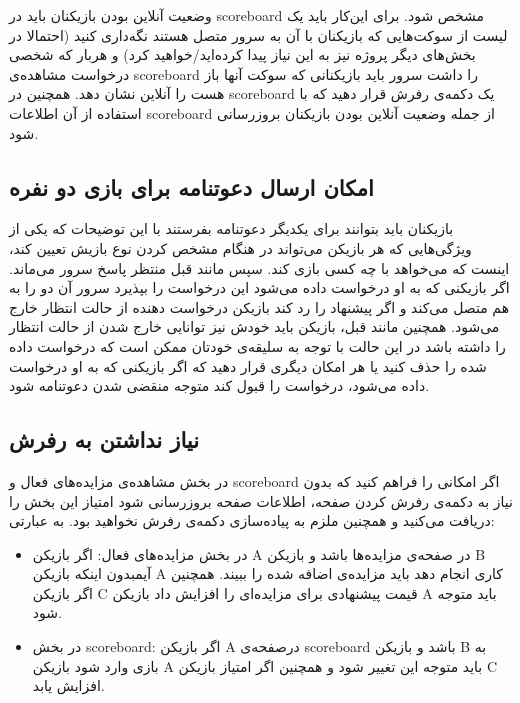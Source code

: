 \documentclass[]{article}
\begin{document}
وضعیت آنلاین بودن بازیکنان باید در scoreboard مشخص شود. برای این‌کار باید یک لیست از سوکت‌هایی که بازیکنان با آن به سرور متصل هستند نگه‌داری کنید (احتمالا در بخش‌های دیگر پروژه نیز به این نیاز پیدا کرده‌اید/خواهید کرد) و هربار که شخصی درخواست مشاهده‌ی scoreboard را داشت سرور باید بازیکنانی که سوکت‌ آنها باز هست را آنلاین نشان دهد. همچنین در scoreboard یک دکمه‌ی رفرش قرار دهید که با استفاده از آن اطلاعات scoreboard از جمله وضعیت آنلاین بودن بازیکنان بروزرسانی شود.

\subsection*{{\titr امکان ارسال دعوتنامه برای بازی دو نفره}}

بازیکنان باید بتوانند برای یکدیگر دعوتنامه بفرستند با این توضیحات که یکی از ویژگی‌هایی که هر بازیکن می‌تواند در هنگام مشخص کردن نوع بازیش تعیین کند، اینست که می‌خواهد با چه کسی بازی کند. سپس مانند قبل منتظر پاسخ سرور می‌ماند. اگر بازیکنی که به او درخواست داده می‌شود این درخواست را بپذیرد سرور آن دو را به هم متصل می‌کند و اگر پیشنهاد را رد کند بازیکن درخواست دهنده از حالت انتظار خارج می‌شود. همچنین مانند قبل، بازیکن باید خودش نیز توانایی خارج شدن از حالت انتظار را داشته باشد در این حالت با توجه به سلیقه‌ی خودتان ممکن است که درخواست داده شده را حذف کنید یا هر امکان دیگری قرار دهید که اگر بازیکنی که به او درخواست داده می‌شود، درخواست را قبول کند متوجه منقضی شدن دعوتنامه شود.

\subsection*{{\titr نیاز نداشتن به رفرش}}
در بخش مشاهده‌ی مزایده‌های فعال و scoreboard اگر امکانی را فراهم کنید که بدون نیاز به دکمه‌ی رفرش کردن صفحه، اطلاعات صفحه بروزرسانی شود امتیاز این بخش را دریافت می‌کنید و همچنین ملزم به پیاده‌سازی دکمه‌ی رفرش نخواهید بود. به عبارتی:

\begin{itemize}
	\item در بخش مزایده‌های فعال: اگر بازیکن A در صفحه‌ی مزایده‌ها باشد و بازیکن B آیمبدون اینکه بازیکن A کاری انجام دهد باید مزایده‌ی اضافه شده را ببیند. همچنین اگر بازیکن C قیمت پیشنهادی برای مزایده‌ای را افزایش داد بازیکن A باید متوجه شود.
	\item در بخش scoreboard: اگر بازیکن A درصفحه‌ی scoreboard باشد و بازیکن B به بازی وارد شود بازیکن A باید متوجه این تغییر شود و همچنین اگر امتیاز بازیکن C افزایش یابد.
\end{itemize}
\end{document}
